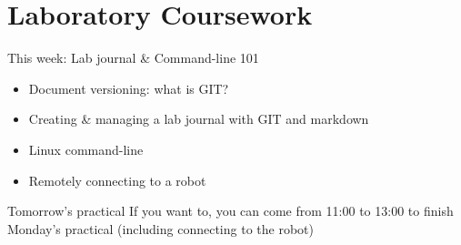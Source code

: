 \documentclass[compress]{beamer}
\begin{document}
\section{Laboratory Coursework}

\begin{frame}{This week: Lab journal \& Command-line 101}
    \begin{itemize}
        \item Document versioning: what is GIT?
        \item Creating \& managing a lab journal with GIT and markdown
        \item Linux command-line
        \item Remotely connecting to a robot
    \end{itemize}

    \begin{exampleblock}{Tomorrow's practical}
        If you want to, you can come from 11:00 to 13:00 to finish Monday's
        practical (including connecting to the robot)
    \end{exampleblock}



\end{frame}
\end{document}
